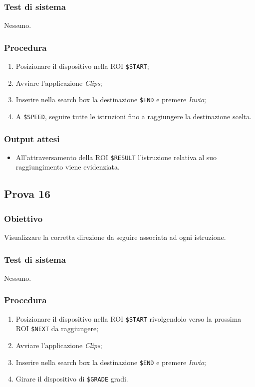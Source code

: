 \documentclass[../SperimentazioniPratiche.tex]{subfiles}
\begin{document}
	\subsubsection{Test di sistema}
		Nessuno.
		
	\subsubsection{Procedura}
		\begin{enumerate}
		\item Posizionare il dispositivo nella ROI  \verb|$START|;
		\item Avviare l'applicazione \textit{Clips};
		\item Inserire nella search box la destinazione  \verb|$END| e premere \textit{Invio};
		\item A \verb|$SPEED|, seguire tutte le istruzioni fino a raggiungere la destinazione scelta.
		\end{enumerate}
		
	\subsubsection{Output attesi}
		\begin{itemize}
		\item All'attraversamento della ROI  \verb|$RESULT| l'istruzione relativa al suo raggiungimento viene evidenziata.
		\end{itemize}

	
		
\newpage	
\subsection{Prova 16} %
\label{subsec:Prova16}	
	
	\subsubsection{Obiettivo}
		Visualizzare la corretta direzione da seguire associata ad ogni istruzione.
		
	\subsubsection{Test di sistema}
		Nessuno.
		
	\subsubsection{Procedura}
		\begin{enumerate}
		\item Posizionare il dispositivo nella ROI \verb|$START| rivolgendolo verso la prossima ROI  \verb|$NEXT| da raggiungere;
		\item Avviare l'applicazione \textit{Clips};
		\item Inserire nella search box la destinazione  \verb|$END| e premere \textit{Invio};
		\item Girare il dispositivo di  \verb|$GRADE| gradi.
		\end{enumerate}
		
\end{document}
